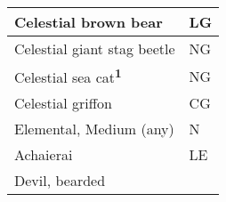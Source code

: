 \begin{longtable}{llll}
{\begin{minipage}[t]{3.326in}
Celestial brown bear\end{minipage}} & \multicolumn{3}{p{0.601in}|}{\begin{minipage}[t]{0.601in}\raggedright
LG\end{minipage}}\\
\hline
\multicolumn{1}{|p{3.326in}|}{\begin{minipage}[t]{3.326in}\raggedright
Celestial giant stag beetle\end{minipage}} & \multicolumn{3}{p{0.601in}|}{\begin{minipage}[t]{0.601in}\raggedright
NG\end{minipage}}\\
\hline
\multicolumn{1}{|p{3.326in}|}{\begin{minipage}[t]{3.326in}\raggedright
Celestial sea cat\textsuperscript{\textbf{1}}\end{minipage}} & \multicolumn{3}{p{0.601in}|}{\begin{minipage}[t]{0.601in}\raggedright
NG\end{minipage}}\\
\hline
\multicolumn{1}{|p{3.326in}|}{\begin{minipage}[t]{3.326in}\raggedright
Celestial griffon\end{minipage}} & \multicolumn{3}{p{0.601in}|}{\begin{minipage}[t]{0.601in}\raggedright
CG\end{minipage}}\\
\hline
\multicolumn{1}{|p{3.326in}|}{\begin{minipage}[t]{3.326in}\raggedright
Elemental, Medium (any)\end{minipage}} & \multicolumn{3}{p{0.601in}|}{\begin{minipage}[t]{0.601in}\raggedright
N\end{minipage}}\\
\hline
\multicolumn{1}{|p{3.326in}|}{\begin{minipage}[t]{3.326in}\raggedright
Achaierai\end{minipage}} & \multicolumn{3}{p{0.601in}|}{\begin{minipage}[t]{0.601in}\raggedright
LE\end{minipage}}\\
\hline
\multicolumn{1}{|p{3.326in}|}{\begin{minipage}[t]{3.326in}\raggedright
Devil, bearded\end{minipage}} & \multicolumn{3}{p{0.601in}|}{\begin{minipage}[t]{0.601in}\raggedright

\end{minipage}}
\end{longtable}

